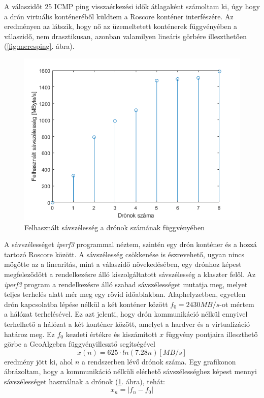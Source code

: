 \noindent
A válaszidőt 25 ICMP ping visszaérkezési idők átlagaként számoltam ki, úgy hogy a drón virtuális konténeréből küldtem a Roscore konténer interfészére. Az eredményen az látszik, hogy nő az üzemeltetett konténerek függvényében a válaszidő, nem drasztikusan, azonban valamilyen lineáris görbére illeszthetően (\ref{fig:meresping}. ábra).  \\

\begin{figure}
	\centering
	\includegraphics{figures/meres_iperf_inv.png}
	\caption{Felhasznált sávszélesség a drónok számának függvényében}
	\label{fig:meresiperf}
\end{figure}

\noindent
A sávszélességet \emph{iperf3} programmal néztem, szintén egy drón konténer és a hozzá tartozó Roscore között. A sávszélesség csökkenése is észrevehető, ugyan nincs mögötte az a linearitás, mint a válaszidő növekedésében, egy drónhoz képest megfeleződött a rendelkezésre álló kiszolgáltatott sávszélesség a klaszter felől. Az \emph{iperf3} program a rendelkezésre álló szabad sávszélességet mutatja meg, melyet teljes terhelés alatt mér meg egy rövid időablakban. Alaphelyzetben, egyetlen drón kapcsolatba lépése nélkül a két konténer között $f_{0}=2430 MB/s$-ot mértem a hálózat terhelésével. Ez azt jelenti, hogy drón kommunikáció nélkül ennyivel terhelhető a hálózat a két konténer között, amelyet a hardver és a virtualizáció határoz meg. Ez $f_0$ kezdeti értékre és kiszámított $x$ függvény pontjaira illeszthető görbe a GeoAlgebra függvényillesztő segítségével \begin{equation} x(n) = 625 \cdot ln(7.28n) [MB/s] \end{equation} eredmény jött ki, ahol $n$ a rendszerben lévő drónok száma. Egy grafikonon ábrázoltam, hogy a kommunikáció nélküli elérhető sávszélességhez képest mennyi sávszélességet használnak a drónok (\ref{fig:meresiperf}. ábra), tehát: \begin{equation}x_n = | f_n - f_0 |\end{equation}  \\

